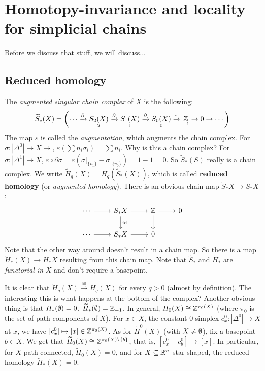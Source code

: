 \section{Homotopy-invariance and locality for simplicial chains} 
Before we discuss that stuff, we will discuss...
\subsection{Reduced homology}
The \emph{augmented singular chain complex} of $X$ is the following: \[
    \widetilde S_*(X)= \left( \cdots \xrightarrow{\partial } \underset{2}{S_2(X)}  \xrightarrow{\partial } \underset{1}{S_1(X)} \xrightarrow{\partial } \underset{0}{S_0(X)} \xrightarrow{\varepsilon } \underset{-1}{\mathbb{Z}}  \to 0 \to \cdots \right) 
\]The map $\varepsilon $ is called the \emph{augmentation}, which augments the chain complex. For $\sigma \colon |\Delta ^0|\to X \to $, $\varepsilon  \left( \sum n_i  \sigma_i  \right) =\sum n_i $. Why is this a chain complex? For $\sigma \colon |\Delta ^1| \to X$, $\varepsilon  \circ \partial \sigma=\varepsilon \left(\left. \sigma \right| _{\{v_1\} }- \left. \sigma \right| _{\{v_0\} }\right)=1-1=0$. So $\widetilde S_*(S)$ really is a chain complex. We write $\widetilde H_q(X) = H_q(\widetilde S_*(X))$, which is called \textbf{reduced homology} (or \emph{augmented homology}). There is an obvious chain map $\widetilde S_*X \to S_*X$:
\[
\begin{tikzcd}
\cdots \arrow[r] & S_*X \arrow[d, "\id"] \arrow[r] & \Z \arrow[d] \arrow[r] & 0 \\
\cdots \arrow[r] & S_*X \arrow[r]                  & 0                      &  
\end{tikzcd}
\] 
Note that the other way around doesn't result in a chain map. So there is a map $\widetilde H_* (X) \to H_*X$ resulting from this chain map. Note that $\widetilde S_*$ and $\widetilde H_*$ are \emph{functorial in} $X$ and don't require a basepoint. 

It is clear that $\widetilde H_q(X) \xrightarrow{\cong} H_q(X)$ for every $q>0$ (almost by definition). The interesting this is what happens at the bottom of the complex? Another obvious thing is that $H_*(\emptyset)=0$, $\widetilde H_*(\emptyset)=\mathbb{Z}_{-1}$. In general, $H_0(X) \cong  \mathbb{Z}^{\pi_0(X)}$ (where $\pi_0$ is the set of path-components of $X$). For $x \in X$, the constant 0-simplex $c^0_x \colon |\Delta ^0| \to X$ at $x$, we have $[c^0 _x] \mapsto [x] \in \mathbb{Z}^{\pi_0(X)}$. As for $\widetilde H^0(X)$ (with $X\neq \emptyset$), fix a basepoint $b \in X$. We get that $\widetilde H_0(X) \cong  \mathbb{Z}^{\pi_0(X) \setminus \{b\} }$, that is, $[c^0_x - c^0_b] \mapsto [x].$ In particular, for $X$ path-connected, $\widetilde H_0(X)=0$, and for $X \subseteq \mathbb{R}^n $ star-shaped, the reduced homology $\widetilde H_*(X)=0$.


